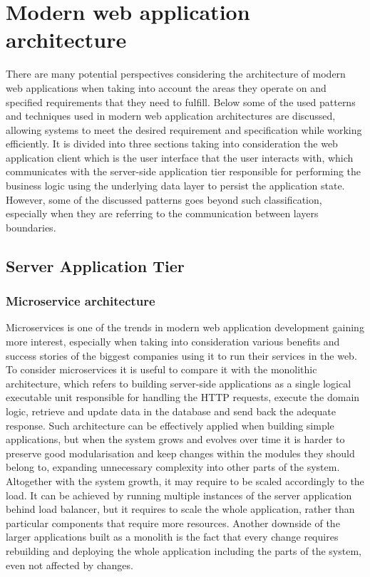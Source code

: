 \section{Modern web application architecture}

There are many potential perspectives considering the architecture of modern web applications when taking into account the areas they operate on and specified requirements that they need to fulfill. Below some of the used patterns and techniques used in modern web application architectures are discussed, allowing systems to meet the desired requirement and specification while working efficiently. It is divided into three sections taking into consideration the web application client which is the user interface that the user interacts with, which communicates with the server-side application tier responsible for performing the business logic using the underlying data layer to persist the application state. However, some of the discussed patterns goes beyond such classification, especially when they are referring to the communication between layers boundaries.

\subsection*{Server Application Tier}

\subsubsection*{Microservice architecture}

Microservices is one of the trends in modern web application development gaining more interest, especially when taking into consideration various benefits and success stories of the biggest companies using it to run their services in the web. To consider microservices it is useful to compare it with the monolithic architecture, which refers to building server-side applications as a single logical executable unit responsible for handling the HTTP requests, execute the domain logic, retrieve and update data in the database and send back the adequate response. Such architecture can be effectively applied when building simple applications, but when the system grows and evolves over time it is harder to preserve good modularisation and keep changes within the modules they should belong to, expanding unnecessary complexity into other parts of the system. Altogether with the system growth, it may require to be scaled accordingly to the load. It can be achieved by running multiple instances of the server application behind load balancer, but it requires to scale the whole application, rather than particular components that require more resources. Another downside of the larger applications built as a monolith is the fact that every change requires rebuilding and deploying the whole application including the parts of the system, even not affected by changes.

